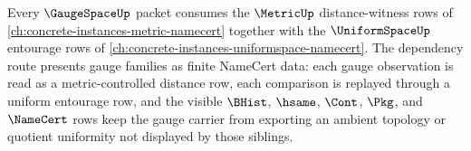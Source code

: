 Every $\GaugeSpaceUp$ packet consumes the $\MetricUp$ distance-witness rows of \autoref{ch:concrete-instances-metric-namecert} together with the $\UniformSpaceUp$ entourage rows of \autoref{ch:concrete-instances-uniformspace-namecert}. The dependency route presents gauge families as finite NameCert data: each gauge observation is read as a metric-controlled distance row, each comparison is replayed through a uniform entourage row, and the visible $\BHist$, $\hsame$, $\Cont$, $\Pkg$, and $\NameCert$ rows keep the gauge carrier from exporting an ambient topology or quotient uniformity not displayed by those siblings.
